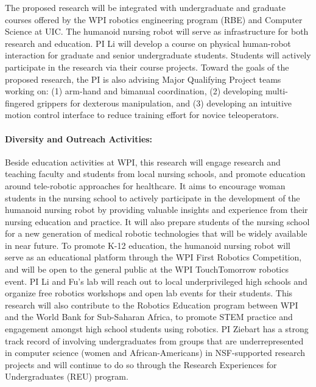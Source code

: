 \documentclass[letterpaper, 11 pt, onecolumn]{article}
\begin{document}
The proposed research will be integrated with undergraduate and graduate courses offered by the WPI robotics engineering program (RBE) and Computer Science at UIC. The humanoid nursing robot will serve as infrastructure for both research and education. PI Li will develop a course on physical human-robot interaction for graduate and senior undergraduate students. Students will actively participate in the research via their course projects. Toward the goals of the proposed research, the PI is also advising Major Qualifying Project teams working on: (1) arm-hand and bimanual coordination, (2) developing multi-fingered grippers for dexterous manipulation, and (3) developing an intuitive motion control interface to reduce training effort for novice teleoperators. 


\paragraph*{Diversity and Outreach Activities:}
Beside education activities at WPI, this research will engage research and teaching faculty and students from local nursing schools, and promote education around tele-robotic approaches for healthcare. It aims to encourage woman students in the nursing school to actively participate in the development of the humanoid nursing robot by providing valuable insights and experience from their nursing education and practice. It will also prepare students of the nursing school for a new generation of medical robotic technologies that will be widely available in near future. To promote K-12 education, the humanoid nursing robot will serve as an educational platform through the WPI First Robotics Competition, and will be open to the general public at the WPI TouchTomorrow robotics event. PI Li and Fu's lab will reach out to local underprivileged high schools and organize free robotics workshops and open lab events for their students. This research will also contribute to the Robotics Education program between WPI and the World Bank for Sub-Saharan Africa, to promote STEM practice and engagement amongst high school students using robotics. 
PI Ziebart has a strong track record of involving undergraduates from groups that are underrepresented in computer science (women and African-Americans) in NSF-supported research projects and will continue to do so through the Research Experiences for Undergraduates (REU) program.
\end{document}
